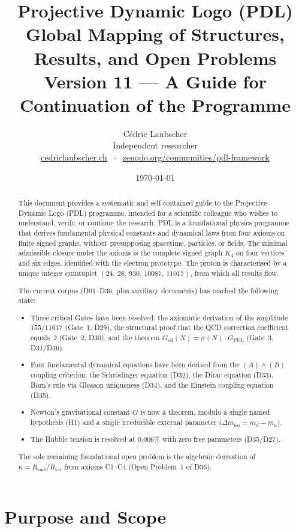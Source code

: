 \documentclass[11pt,a4paper]{article}
\title{Projective Dynamic Logo (PDL)\\[4pt]
\large Global Mapping of Structures, Results, and Open Problems\\[2pt]
\normalsize Version 11 — A Guide for Continuation of the Programme}
\author{C\'edric Laubscher\\[4pt]
\small Independent researcher\\
\small \href{https://cedriclaubscher.ch}{cedriclaubscher.ch}
$\;\cdot\;$
\small \href{https://zenodo.org/communities/pdl-framework/}{zenodo.org/communities/pdl-framework}}
\date{\today}
\theoremstyle{plain}
\theoremstyle{definition}
\theoremstyle{remark}
\newcommand{\Kfour}{K_4}
\newcommand{\quintuplet}{(24,\,28,\,930,\,10087,\,11017)}
\newcommand{\Geff}{G_{\mathrm{eff}}}
\newcommand{\GPDL}{G_{\mathrm{PDL}}}
\newcommand{\Rsurf}{R_{\mathrm{surf}}}
\newcommand{\Rtot}{R_{\mathrm{tot}}}
\newcommand{\sigmaN}{\sigma(N)}
\begin{document}
\maketitle
\setcounter{tocdepth}{2}
\tableofcontents
\clearpage

\begin{abstract}
This document provides a systematic and self-contained guide to the Projective Dynamic Logo (PDL) programme, intended for a scientific colleague who wishes to understand, verify, or continue the research.
PDL is a foundational physics programme that derives fundamental physical constants and dynamical laws from four axioms on finite signed graphs, without presupposing spacetime, particles, or fields.
The minimal admissible closure under the axioms is the complete signed graph $\Kfour$ on four vertices and six edges, identified with the electron prototype.
The proton is characterised by a unique integer quintuplet $\quintuplet$, from which all results flow.

The current corpus (D01--D36, plus auxiliary documents) has reached the following state:
\begin{itemize}
\item Three critical Gates have been resolved: the axiomatic derivation of the amplitude $155/11017$ (Gate~1, D29), the structural proof that the QCD correction coefficient equals~2 (Gate~2, D30), and the theorem $\Geff(N)=\sigmaN\cdot\GPDL$ (Gate~3, D31/D36).
\item Four fundamental dynamical equations have been derived from the $(A)\wedge(B)$ coupling criterion: the Schr\"odinger equation (D32), the Dirac equation (D33), Born's rule via Gleason uniqueness (D34), and the Einstein coupling equation (D35).
\item Newton's gravitational constant $G$ is now a theorem, modulo a single named hypothesis (H1) and a single irreducible external parameter ($\Delta m_{\mathrm{iso}} = m_d - m_u$).
\item The Hubble tension is resolved at $0.006\%$ with zero free parameters (D35/D27).
\end{itemize}
The sole remaining foundational open problem is the algebraic derivation of $\kappa = \Rsurf/\Rtot$ from axioms C1--C4 (Open Problem~1 of D36).
\end{abstract}

\section{Purpose and Scope}
\label{sec:purpose}
\end{document}
